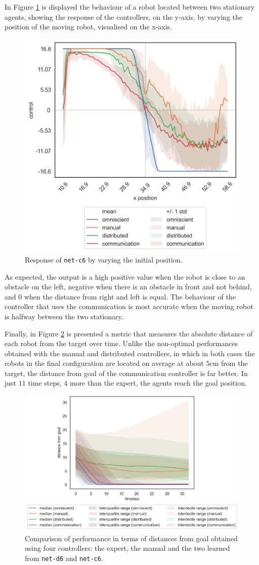 In Figure \ref{fig:net-c6responseposition} is displayed the behaviour of a robot 
located between two stationary agents, showing the response of the controllers, 
on the y-axis, by varying the position of the moving robot, visualised on the 
x-axis.  
\begin{figure}[!htb]
	\centering
	\includegraphics[width=.45\textwidth]{contents/images/net-c6/response-varying_init_position-communication}%
	\caption{Response of \texttt{net-c6} by varying the initial position.}
	\label{fig:net-c6responseposition}
\end{figure}
As expected, the output is a high positive value when the robot is close to an 
obstacle on the left, negative when there is an obstacle in front and not behind, 
and $0$ when the distance from right and left is equal.
The behaviour of the controller that uses the communication is most accurate 
when the moving robot is halfway between the two stationary.

Finally, in Figure \ref{fig:net-c6distance} is presented a metric that measures the 
absolute distance of each robot from the target over time.
Unlike the non-optimal performances obtained with the manual and distributed 
controllers, in which in both cases the robots in the final configuration are 
located on average at about $5$\gls{cm} from the target, the distance from goal 
of the communication controller is far better. In just $11$ time steps, $4$ more 
than the expert, the agents reach the goal position.
\begin{figure}[H]
	\centering
	\includegraphics[width=.65\textwidth]{contents/images/net-c6/distances-from-goal-compressed-communication}%
	\caption[Evaluation of \texttt{net-c6} distances from goal.]{Comparison of 
		performance in terms of distances from goal obtained using four controllers: 
		the expert, the manual and the two learned from \texttt{net-d6} and 
		\texttt{net-c6}.}
	\label{fig:net-c6distance}
\end{figure}

